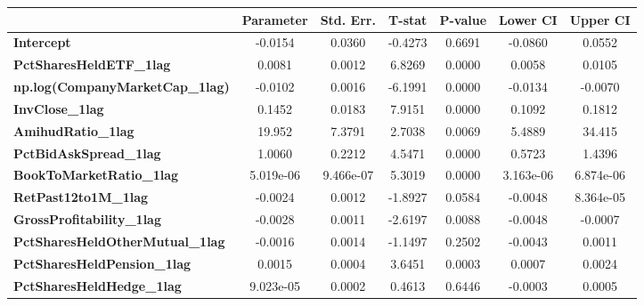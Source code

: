 \begin{center}
\begin{tabular}{lclc}
\bottomrule
\end{tabular}
\begin{tabular}{lcccccc}
                                        & \textbf{Parameter} & \textbf{Std. Err.} & \textbf{T-stat} & \textbf{P-value} & \textbf{Lower CI} & \textbf{Upper CI}  \\
\midrule
\textbf{Intercept}                      &      -0.0154       &       0.0360       &     -0.4273     &      0.6691      &      -0.0860      &       0.0552       \\
\textbf{PctSharesHeldETF\_1lag}         &       0.0081       &       0.0012       &      6.8269     &      0.0000      &       0.0058      &       0.0105       \\
\textbf{np.log(CompanyMarketCap\_1lag)} &      -0.0102       &       0.0016       &     -6.1991     &      0.0000      &      -0.0134      &      -0.0070       \\
\textbf{InvClose\_1lag}                 &       0.1452       &       0.0183       &      7.9151     &      0.0000      &       0.1092      &       0.1812       \\
\textbf{AmihudRatio\_1lag}              &       19.952       &       7.3791       &      2.7038     &      0.0069      &       5.4889      &       34.415       \\
\textbf{PctBidAskSpread\_1lag}          &       1.0060       &       0.2212       &      4.5471     &      0.0000      &       0.5723      &       1.4396       \\
\textbf{BookToMarketRatio\_1lag}        &     5.019e-06      &     9.466e-07      &      5.3019     &      0.0000      &     3.163e-06     &     6.874e-06      \\
\textbf{RetPast12to1M\_1lag}            &      -0.0024       &       0.0012       &     -1.8927     &      0.0584      &      -0.0048      &     8.364e-05      \\
\textbf{GrossProfitability\_1lag}       &      -0.0028       &       0.0011       &     -2.6197     &      0.0088      &      -0.0048      &      -0.0007       \\
\textbf{PctSharesHeldOtherMutual\_1lag} &      -0.0016       &       0.0014       &     -1.1497     &      0.2502      &      -0.0043      &       0.0011       \\
\textbf{PctSharesHeldPension\_1lag}     &       0.0015       &       0.0004       &      3.6451     &      0.0003      &       0.0007      &       0.0024       \\
\textbf{PctSharesHeldHedge\_1lag}       &     9.023e-05      &       0.0002       &      0.4613     &      0.6446      &      -0.0003      &       0.0005       \\

\end{tabular}
\end{center}
